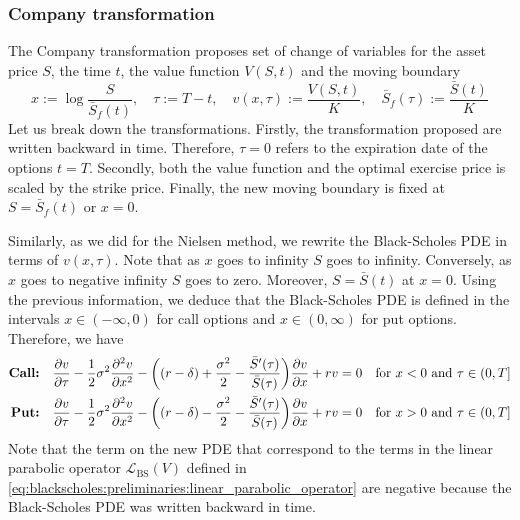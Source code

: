 \subsubsection{Company transformation}
The Company transformation proposes set of change of variables for the asset price $S$, the time $t$, the value function $V(S,t)$ and the moving boundary
\begin{equation}
  x := \log \dfrac{S}{\bar{S}_f(t)}, \quad \tau := T - t, \quad v(x, \tau) := \dfrac{V(S, t)}{K}, \quad \bar{S}_f(\tau) := \dfrac{\bar{S}(t)}{K} 
\end{equation}
Let us break down the transformations. Firstly, the transformation proposed are written backward in time. Therefore, $\tau = 0$ refers to the expiration date of the options $t=T$. Secondly, both the value function and the optimal exercise price is scaled by the strike price. Finally, the new moving boundary is fixed at $S=\bar{S}_f(t)$ or $x=0$.

Similarly, as we did for the Nielsen method, we rewrite the Black-Scholes PDE in terms of $v(x, \tau)$. Note that as $x$ goes to infinity $S$ goes to infinity. Conversely, as $x$ goes to negative infinity $S$ goes to zero. Moreover, $S=\bar{S}(t)$ at $x=0$. Using the previous information, we deduce  that the Black-Scholes PDE is defined in the intervals $x\in(-\infty, 0)$ for call options and $x\in(0, \infty)$ for put options. Therefore, we have
{
\allowdisplaybreaks 
\begin{subequations}
  \begin{align}
      \text{\textbf{Call:}} \quad \dfrac{\partial v}{\partial \tau} - \dfrac{1}{2}\sigma^2\dfrac{\partial^2 v}{\partial x^2} - \bigg((r-\delta) + \dfrac{\sigma^2}{2} - \dfrac{\bar{S}'(\tau)}{\bar{S}(\tau)} \bigg)\dfrac{\partial v}{\partial x} + rv = 0 \quad \text{for $x < 0$ and $\tau \in (0, T]$} \\
      \text{\textbf{Put:}} \quad \dfrac{\partial v}{\partial \tau} - \dfrac{1}{2}\sigma^2\dfrac{\partial^2 v}{\partial x^2} - \bigg((r-\delta) - \dfrac{\sigma^2}{2} - \dfrac{\bar{S}'(\tau)}{\bar{S}(\tau)} \bigg)\dfrac{\partial v}{\partial x} + rv = 0 \quad \text{for $x > 0$ and $\tau \in (0, T]$}
  \end{align}
\end{subequations}
}
Note that the term on the new PDE that correspond to the terms in the linear parabolic operator $\mathcal{L}_\text{BS}(V)$ defined in \eqref{eq:blackscholes:preliminaries:linear_parabolic_operator} are negative because the Black-Scholes PDE was written backward in time.

